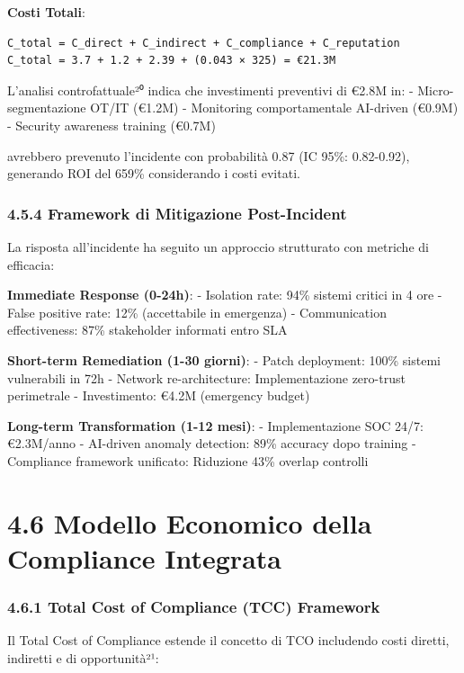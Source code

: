 \documentclass{report}
\begin{document}
\textbf{Costi Totali}:

\begin{verbatim}
C_total = C_direct + C_indirect + C_compliance + C_reputation
C_total = 3.7 + 1.2 + 2.39 + (0.043 × 325) = €21.3M
\end{verbatim}

L'analisi controfattuale²⁰ indica che investimenti preventivi di €2.8M
in: - Micro-segmentazione OT/IT (€1.2M) - Monitoring comportamentale
AI-driven (€0.9M) - Security awareness training (€0.7M)

avrebbero prevenuto l'incidente con probabilità 0.87 (IC 95\%:
0.82-0.92), generando ROI del 659\% considerando i costi evitati.

\subsubsection{4.5.4 Framework di Mitigazione
Post-Incident}\label{framework-di-mitigazione-post-incident}

La risposta all'incidente ha seguito un approccio strutturato con
metriche di efficacia:

\textbf{Immediate Response (0-24h)}: - Isolation rate: 94\% sistemi
critici in 4 ore - False positive rate: 12\% (accettabile in emergenza)
- Communication effectiveness: 87\% stakeholder informati entro SLA

\textbf{Short-term Remediation (1-30 giorni)}: - Patch deployment: 100\%
sistemi vulnerabili in 72h - Network re-architecture: Implementazione
zero-trust perimetrale - Investimento: €4.2M (emergency budget)

\textbf{Long-term Transformation (1-12 mesi)}: - Implementazione SOC
24/7: €2.3M/anno - AI-driven anomaly detection: 89\% accuracy dopo
training - Compliance framework unificato: Riduzione 43\% overlap
controlli

\section{4.6 Modello Economico della Compliance
Integrata}\label{modello-economico-della-compliance-integrata}

\subsubsection{4.6.1 Total Cost of Compliance (TCC)
Framework}\label{total-cost-of-compliance-tcc-framework}

Il Total Cost of Compliance estende il concetto di TCO includendo costi
diretti, indiretti e di opportunità²¹:
\end{document}
